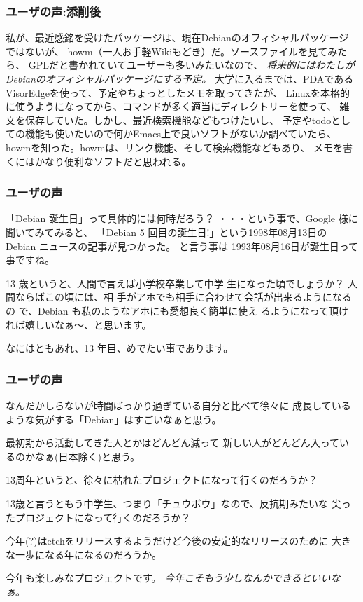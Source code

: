 \documentclass[cjk,dvipdfmx]{beamer}
\begin{document}
\begin{frame}
 \frametitle{ユーザの声:添削後}
私が、最近感銘を受けたパッケージは、現在Debianのオフィシャルパッケージではないが、
howm（一人お手軽Wikiもどき）だ。ソースファイルを見てみたら、
GPLだと書かれていてユーザーも多いみたいなので、
{\em 将来的にはわたしがDebianのオフィシャルパッケージにする予定。}
大学に入るまでは、PDAであるVisorEdgeを使って、予定やちょっとしたメモを取ってきたが、
Linuxを本格的に使うようになってから、コマンドが多く適当にディレクトリーを使って、
雑文を保存していた。しかし、最近検索機能などもつけたいし、
予定やtodoとしての機能も使いたいので何かEmacs上で良いソフトがないか調べていたら、
howmを知った。howmは、リンク機能、そして検索機能などもあり、
メモを書くにはかなり便利なソフトだと思われる。
\end{frame}

\begin{frame}
 \frametitle{ユーザの声}
    「Debian 誕生日」って具体的には何時だろう？
・・・という事で、Google 様に聞いてみてみると、
「Debian 5 回目の誕生日!」という1998年08月13日の
Debian ニュースの記事が見つかった。  と言う事は
1993年08月16日が誕生日って事ですね。

    13 歳というと、人間で言えば小学校卒業して中学
生になった頃でしょうか？  人間ならばこの頃には、相
手がアホでも相手に合わせて会話が出来るようになるの
で、Debian も私のようなアホにも愛想良く簡単に使え
るようになって頂ければ嬉しいなぁ〜、と思います。

    なにはともあれ、13 年目、めでたい事であります。
\end{frame}

\begin{frame}
 \frametitle{ユーザの声}

なんだかしらないが時間ばっかり過ぎている自分と比べて徐々に
成長しているような気がする「Debian」はすごいなぁと思う。

最初期から活動してきた人とかはどんどん減って
新しい人がどんどん入っているのかなぁ(日本除く)と思う。

13周年というと、徐々に枯れたプロジェクトになって行くのだろうか？

13歳と言うともう中学生、つまり「チュウボウ」なので、反抗期みたいな
尖ったプロジェクトになって行くのだろうか？

今年(?)はetchをリリースするようだけど今後の安定的なリリースのために
大きな一歩になる年になるのだろうか。

今年も楽しみなプロジェクトです。
{\em 今年こそもう少しなんかできるといいなぁ。}
\end{frame}
\end{document}
